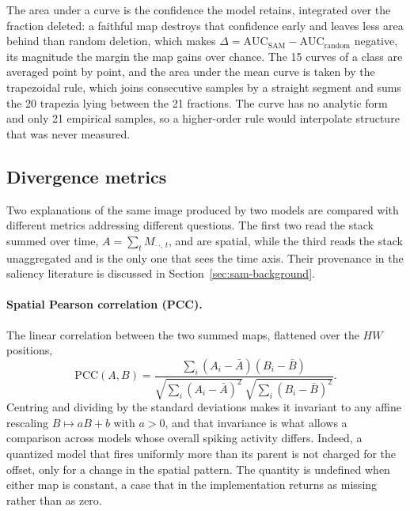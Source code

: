 The area under a curve is the confidence the model retains, integrated over the
fraction deleted: a faithful map destroys that confidence early and leaves less
area behind than random deletion, which makes
$\Delta = \mathrm{AUC}_{\mathrm{SAM}} - \mathrm{AUC}_{\mathrm{random}}$ negative,
its magnitude the margin the map gains over chance. The 15 curves of a class are
averaged point by point, and the area under the mean curve is taken by the
trapezoidal rule, which joins consecutive samples by a straight segment and sums
the 20 trapezia lying between the 21 fractions. The curve has no analytic form
and only 21 empirical samples, so a higher-order rule would interpolate
structure that was never measured.

\subsection{Divergence metrics}
\label{sec:metrics}

Two explanations of the same image produced by two models are compared with
different metrics addressing different questions.
The first two read the stack summed over time,
$A = \sum_{t} M_{\cdot\,\cdot,\,t}$, and are spatial, while the third reads the stack
unaggregated and is the only one that sees the time axis. Their provenance in
the saliency literature is discussed in Section~\ref{sec:sam-background}.

\paragraph{Spatial Pearson correlation (PCC).} The linear correlation between
the two summed maps, flattened over the $HW$ positions,
\begin{equation}
\mathrm{PCC}(A, B) =
\frac{\sum_{i} (A_i - \bar{A})(B_i - \bar{B})}
     {\sqrt{\sum_{i} (A_i - \bar{A})^2}\ \sqrt{\sum_{i} (B_i - \bar{B})^2}} .
\label{eq:pcc}
\end{equation}
Centring and dividing by the standard deviations makes it invariant to any
affine rescaling $B \mapsto aB + b$ with $a > 0$, and that
invariance is what allows a comparison across models whose overall spiking
activity differs. Indeed, a quantized model that fires uniformly more than its parent
is not charged for the offset, only for a change in the spatial pattern. The
quantity is undefined when either map is constant, a case that in the implementation
returns as missing rather than as zero.

